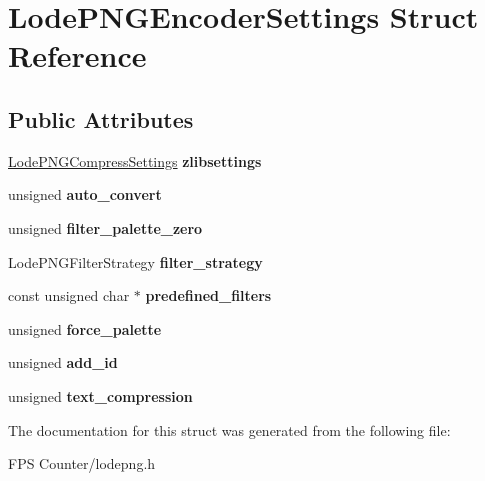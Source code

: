 \hypertarget{struct_lode_p_n_g_encoder_settings}{}\section{Lode\+P\+N\+G\+Encoder\+Settings Struct Reference}
\label{struct_lode_p_n_g_encoder_settings}
\subsection*{Public Attributes}
\begin{DoxyCompactItemize}
\item 
\mbox{\label{struct_lode_p_n_g_encoder_settings_a2c5928b4172c75e27de467870f2ff946}} 
\mbox{\hyperlink{struct_lode_p_n_g_compress_settings}{Lode\+P\+N\+G\+Compress\+Settings}} {\bfseries zlibsettings}
\item 
\mbox{\label{struct_lode_p_n_g_encoder_settings_a1203b8db6532c9ff4a5c8ee692cd327a}} 
unsigned {\bfseries auto\+\_\+convert}
\item 
\mbox{\label{struct_lode_p_n_g_encoder_settings_a0d82e8f2fabcb6cebbc54b80922945f1}} 
unsigned {\bfseries filter\+\_\+palette\+\_\+zero}
\item 
\mbox{\label{struct_lode_p_n_g_encoder_settings_a5e18e4eb941763a2e3e6c65ee9f0729c}} 
Lode\+P\+N\+G\+Filter\+Strategy {\bfseries filter\+\_\+strategy}
\item 
\mbox{\label{struct_lode_p_n_g_encoder_settings_a4446f87b5283f25664802a1be037e76e}} 
const unsigned char $\ast$ {\bfseries predefined\+\_\+filters}
\item 
\mbox{\label{struct_lode_p_n_g_encoder_settings_a04dc9622ccd1d7c74c56291409aa512a}} 
unsigned {\bfseries force\+\_\+palette}
\item 
\mbox{\label{struct_lode_p_n_g_encoder_settings_a893aa542aa7c122c32ee36dd716fbcb2}} 
unsigned {\bfseries add\+\_\+id}
\item 
\mbox{\label{struct_lode_p_n_g_encoder_settings_a6ffdcb8e85a65ea208fe027be072d710}} 
unsigned {\bfseries text\+\_\+compression}
\end{DoxyCompactItemize}


The documentation for this struct was generated from the following file\+:\begin{DoxyCompactItemize}
\item 
F\+P\+S Counter/lodepng.\+h\end{DoxyCompactItemize}
